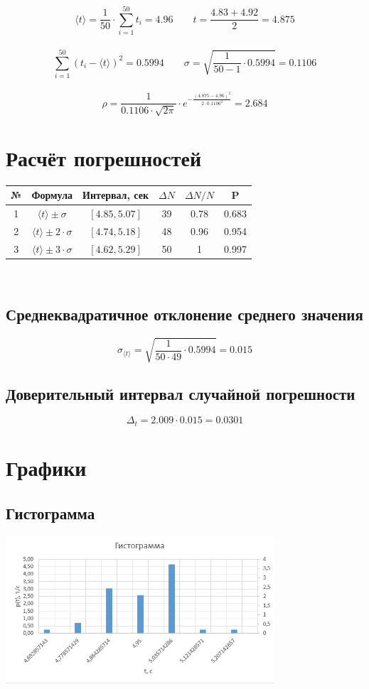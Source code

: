 \documentclass[12pt,a4paper]{article}
\begin{document}
$$\langle t\rangle=\frac{1}{50}\cdot\sum_{i=1}^{50}{t_i}=4.96  \qquad t=\frac{4.83 + 4.92}{2}=4.875$$ \\
$$\sum_{i=1}^{50}(t_i - \langle t\rangle)^2=0.5994\qquad\sigma=\sqrt{\frac{1}{50 - 1}\cdot0.5994}=0.1106$$ \\
$$\rho=\frac{1}{0.1106\cdot\sqrt{2\pi}}\cdot e^{-\frac{(4.875-4.96)^2}{2\cdot0.1106^2}}=2.684$$
\section{Расчёт погрешностей}
\begin{tabular}{|c|c|c|c|c|c|}
    \hline
    № & Формула & Интервал, сек & $\Delta N$ & $\Delta N / N$ & P \\
    \hline
    1 & $\langle t\rangle \pm \sigma$ & $[4.85, 5.07]$ & 39 & 0.78 & 0.683 \\
    \hline
    2 & $\langle t\rangle \pm 2\cdot\sigma$ & $[4.74, 5.18]$ & 48 & 0.96 & 0.954 \\
    \hline
    3 & $\langle t\rangle \pm 3\cdot\sigma$ & $[4.62, 5.29]$ & 50 & 1 & 0.997 \\
    \hline
\end{tabular} \\
\hfill\break
\subsection{Среднеквадратичное отклонение среднего значения}
$$\sigma_{\langle t\rangle}=\sqrt{\frac{1}{50\cdot 49}\cdot0.5994}=0.015$$
\subsection{Доверительный интервал случайной погрешности}
$$\Delta_t=2.009\cdot0.015=0.0301$$
\section{Графики} 
\subsection{Гистограмма}
\begin{center}
    \includegraphics[width=10cm]{gysto.png}
\end{center}
\end{document}
